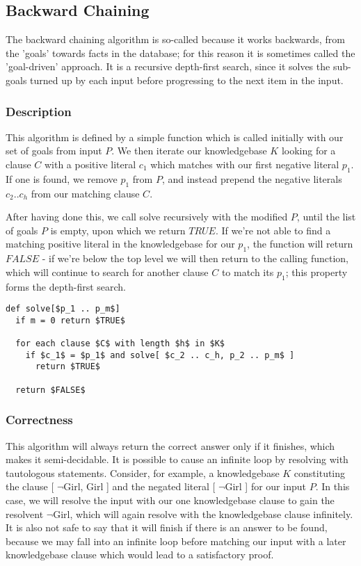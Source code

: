 \documentclass{article}
\begin{document}
\subsection{Backward Chaining}

The backward chaining algorithm is so-called because it works backwards, from the
'goals' towards facts in the database; for this reason it is sometimes called
the 'goal-driven' approach. It is a recursive depth-first search, since 
it solves the sub-goals turned up by each input before progressing to the next 
item in the input.

\subsubsection{Description}

This algorithm is defined by a simple function which is called initially with
our set of goals from input $P$. We then iterate our knowledgebase $K$ looking for a
clause $C$ with a positive literal $c_1$ which matches with our first negative
literal $p_1$. If one is found, we remove $p_1$ from $P$, and instead prepend
the negative literals $c_2 .. c_h$ from our matching clause $C$.

After having done this, we call solve recursively with the modified $P$, until
the list of goals $P$ is empty, upon which we return $TRUE$. If we're not able
to find a matching positive literal in the knowledgebase for our $p_1$, the
function will return $FALSE$ - if we're below the top level we will then return
to the calling function, which will continue to search for another clause $C$ to
match its $p_1$; this property forms the depth-first search.

\begin{lstlisting}[mathescape=true]
def solve[$p_1 .. p_m$]
  if m = 0 return $TRUE$

  for each clause $C$ with length $h$ in $K$
    if $c_1$ = $p_1$ and solve[ $c_2 .. c_h, p_2 .. p_m$ ]
      return $TRUE$
  
  return $FALSE$
\end{lstlisting}

\subsubsection{Correctness}

This algorithm will always return the correct answer only if it finishes, which
makes it semi-decidable.\cite{krr} It is possible to cause an infinite loop by resolving
with tautologous statements. Consider, for example, a knowledgebase $K$ constituting
the clause [ $\neg$Girl, Girl ] and the negated literal [ $\neg$Girl ] for our
input $P$. In this case, we will resolve the input with our one knowledgebase 
clause to gain the resolvent $\neg$Girl, which will again resolve with the
knowledgebase clause infinitely. It is also not safe to say
that it will finish if there is an answer to be found, because we may fall into
an infinite loop before matching our input with a later knowledgebase clause
which would lead to a satisfactory proof.
\end{document}
